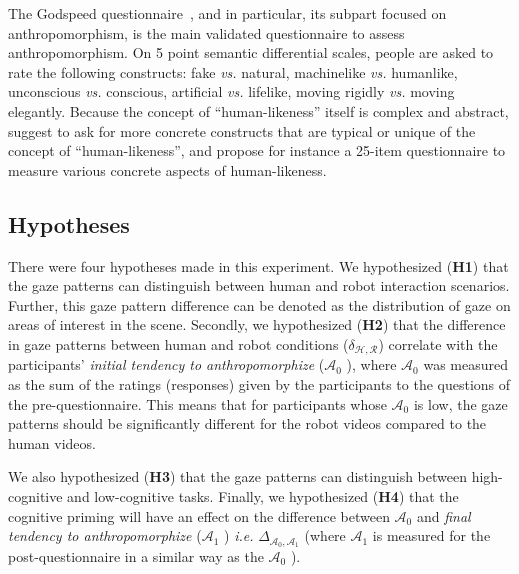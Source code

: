 \documentclass[a4,twocolumn,10pt]{article}
\newcommand{\ie}{\textit{i.e.}\xspace}
\newcommand{\vs}{\textit{vs.}\xspace}
\newcommand{\anti}{{$\mathcal{A}_0$ }}
\newcommand{\antf}{{$\mathcal{A}_1$ }}
\newcommand{\deltaant}{{ $\Delta_{\mathcal{A}_0,\mathcal{A}_1}$ }}
\begin{document}
The Godspeed questionnaire~\citep{bartneck_measurement_2008}, and in particular,
its subpart focused on anthropomorphism, is the main validated questionnaire to
assess anthropomorphism. On 5 point semantic differential scales, people are
asked to rate the following constructs: fake \vs natural, machinelike \vs
humanlike, unconscious \vs conscious, artificial \vs lifelike, moving rigidly
\vs moving elegantly. Because the concept of ``human-likeness'' itself is
complex and abstract, \cite{kahn_jr._robotic_2006} suggest to ask for more
concrete constructs that are typical or unique of the concept of
``human-likeness'', and \cite{ruijten_introducing_2014} propose for instance a
25-item questionnaire to measure various concrete aspects of human-likeness.



\subsection{Hypotheses}

There were four hypotheses made in this experiment. We hypothesized (\textbf{H1}) that the gaze patterns can
distinguish between human and robot interaction scenarios. Further, this gaze
pattern difference can be denoted as the distribution of gaze on areas of
interest in the scene.  Secondly, we hypothesized (\textbf{H2}) that the
difference in gaze patterns between human and robot conditions
($\delta_{\mathcal{H},\mathcal{R}}$) correlate with the participants'
\textit{initial tendency to anthropomorphize} (\anti), where \anti was measured
as the sum of the ratings (responses) given by the participants to the questions
of the pre-questionnaire. This means that for participants whose \anti is low,
the gaze patterns should be significantly different for the robot videos
compared to the human videos.

We also hypothesized (\textbf{H3}) that the gaze patterns can distinguish
between high-cognitive and low-cognitive tasks. Finally, we hypothesized
(\textbf{H4}) that the cognitive priming will have an effect on the difference
between \anti and \textit{final tendency to anthropomorphize} (\antf) \ie
\deltaant (where \antf is measured for the post-questionnaire in a similar way
as the \anti).
\end{document}
